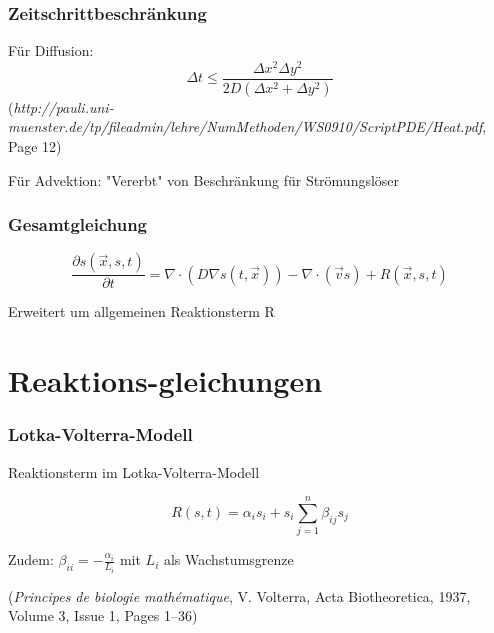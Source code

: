 \documentclass[12pt]{beamer}
\begin{document}
    \begin{frame}
      \frametitle{Zeitschrittbeschränkung}
      Für Diffusion:
      $$\Delta t \leq \frac{\Delta x^2 \Delta y^2}{2D(\Delta x^2 + \Delta y^2)}$$
      {\tiny (\emph{http://pauli.uni-muenster.de/tp/fileadmin/lehre/NumMethoden/WS0910/ScriptPDE/Heat.pdf}, Page 12)}
      
      Für Advektion: "Vererbt" von Beschränkung für Strömungslöser
    \end{frame}

  \begin{frame}
    \frametitle{Gesamtgleichung}
    $$\frac{\partial s(\vec{x},s,t)}{\partial t} = \nabla \cdot (D \nabla s(t,\vec{x})) - \nabla \cdot (\vec{v}s) + R(\vec{x},s,t)$$
    
    Erweitert um allgemeinen Reaktionsterm R
  \end{frame}

  \section{Reaktions-gleichungen}
    \begin{frame}
    \frametitle{Lotka-Volterra-Modell}
    Reaktionsterm im Lotka-Volterra-Modell
    
    $$R(s,t) = \alpha_i s_i + s_i \sum_{j=1}^{n} \beta_{ij} s_j$$
    
    Zudem: $\beta_{ii} = -\frac{\alpha_i}{L_i}$ mit $L_i$ als Wachstumsgrenze
    
    {\tiny (\emph{Principes de biologie mathématique}, V. Volterra, Acta Biotheoretica, 1937, Volume 3, Issue 1, Pages 1–36)}
    \end{frame}
    
\end{document}
